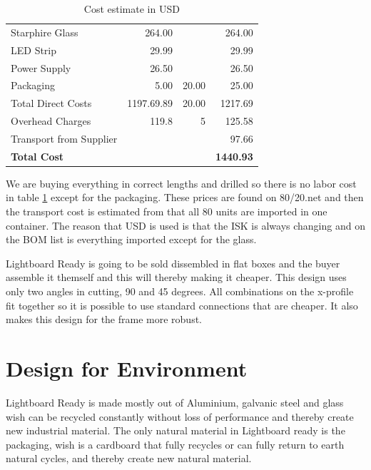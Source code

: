\documentclass[a4paper]{jpconf}
\begin{document}
\begin{table}[]
\begin{tabular}{lrr|r}
		Starphire Glass & 264.00 & & 264.00 \\
		LED Strip & 29.99 & & 29.99 \\
		Power Supply & 26.50 & & 26.50\\
		Packaging & 5.00 & 20.00 & 25.00 \\ \hline
		Total Direct Costs & 1197.69.89 & 20.00 & 1217.69 \\
		Overhead Charges & 119.8  & 5 & 125.58 \\
		Transport from Supplier & & & 97.66 \\
		\textbf{Total Cost} &   &  & \textbf{1440.93} \\ \hline
	\end{tabular}
	\caption{Cost estimate in USD \cite{8020} \cite{ispan}}
	\label{tab:cost}
\end{table}

We are buying everything in correct lengths and drilled so there is no labor cost in table \ref{tab:cost} except for the packaging.
These prices are found on 80/20.net and then the transport cost is estimated from that all 80 units are imported in one container.
The reason that USD is used is that the ISK is always changing and on the BOM list is everything imported except for the glass. 

Lightboard Ready is going to be sold dissembled  %
in flat boxes and the buyer %
assemble it themself and 
this will %
thereby making it cheaper.
This design uses only two angles in cutting, 90 and 45 degrees.
All combinations on the x-profile fit together so it is possible to use standard connections that are cheaper.
It also makes this design for the frame more robust.
\section{Design for Environment}


Lightboard Ready is made mostly out of Aluminium, galvanic steel and glass wish can be recycled constantly without loss of performance and thereby create new industrial material.
The only natural material in Lightboard ready is the packaging, wish is a cardboard that fully recycles or can fully return to earth natural cycles, and thereby create new natural material.
\end{document}
